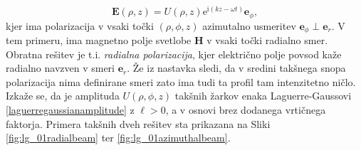 \documentclass[longbibliography,slovene,a4paper,12pt]{book}
\newcommand{\E}{\text{e}}
\newcommand{\I}{\text{i}}
\begin{document}
\begin{equation}
\mathbf{E} (\rho,z) = U(\rho, z) \E^{\I (kz-\omega t)} \mathbf{e}_\phi,
\end{equation}
kjer ima polarizacija v vsaki točki $(\rho, \phi, z)$ azimutalno usmeritev $\mathbf{e}_\phi \perp \mathbf{e}_{r}$. V tem primeru, ima magnetno polje svetlobe $\mathbf{H}$ v vsaki točki radialno smer. Obratna rešitev je t.i. \emph{radialna polarizacija}, kjer električno polje povsod kaže radialno navzven v smeri $\mathbf{e}_{r}$. Že iz nastavka sledi, da v sredini takšnega snopa polarizacija nima definirane smeri zato ima tudi ta profil tam intenzitetno ničlo. Izkaže se, da je amplituda $U(\rho, \phi, z)$ takšnih žarkov enaka Laguerre-Gaussovi \ref{laguerregaussianamplitude} z $\ell > 0$, a v osnovi brez dodanega vrtičnega faktorja\cite{zhan}. Primera takšnih dveh rešitev sta prikazana na Sliki \ref{fig:lg_01radialbeam} ter \ref{fig:lg_01azimuthalbeam}.
\end{document}
